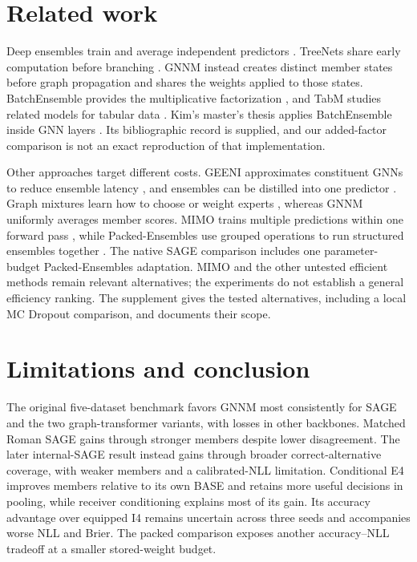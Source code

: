 \documentclass{article}
\begin{document}
\section{Related work}
Deep ensembles train and average independent predictors \citep{lakshminarayanan2017simple}. TreeNets share early computation before branching \citep{lee2015heads}. GNNM instead creates distinct member states before graph propagation and shares the weights applied to those states. BatchEnsemble provides the multiplicative factorization \citep{wen2020batchensemble}, and TabM studies related models for tabular data \citep{gorishniy2025tabm}. Kim's master's thesis applies BatchEnsemble inside GNN layers \citep{kim2023efficient}. Its bibliographic record is supplied, and our added-factor comparison is not an exact reproduction of that implementation.

Other approaches target different costs. GEENI approximates constituent GNNs to reduce ensemble latency \citep{nagarajan2022geeni}, and ensembles can be distilled into one predictor \citep{zhang2024e2gnn}. Graph mixtures learn how to choose or weight experts \citep{wang2023graph,deng2025mixture}, whereas GNNM uniformly averages member scores. MIMO trains multiple predictions within one forward pass \citep{havasi2021training}, while Packed-Ensembles use grouped operations to run structured ensembles together \citep{laurent2023packed}. The native SAGE comparison includes one parameter-budget Packed-Ensembles adaptation. MIMO and the other untested efficient methods remain relevant alternatives; the experiments do not establish a general efficiency ranking. The supplement gives the tested alternatives, including a local MC Dropout comparison, and documents their scope.

\section{Limitations and conclusion}
The original five-dataset benchmark favors GNNM most consistently for SAGE and the two graph-transformer variants, with losses in other backbones. Matched Roman SAGE gains through stronger members despite lower disagreement. The later internal-SAGE result instead gains through broader correct-alternative coverage, with weaker members and a calibrated-NLL limitation. Conditional E4 improves members relative to its own BASE and retains more useful decisions in pooling, while receiver conditioning explains most of its gain. Its accuracy advantage over equipped I4 remains uncertain across three seeds and accompanies worse NLL and Brier. The packed comparison exposes another accuracy--NLL tradeoff at a smaller stored-weight budget.
\end{document}
